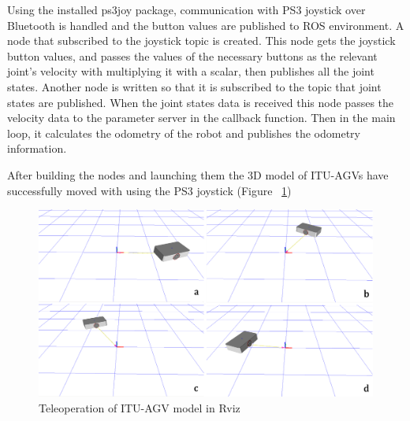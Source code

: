 		Using the installed ps3joy package, communication with PS3 joystick over Bluetooth is handled and the button values are published to ROS environment. A node that subscribed to the joystick topic is created. This node gets the joystick button values, and passes the values of the necessary buttons as the relevant joint’s velocity with multiplying it with a scalar, then publishes all the joint states. Another node is written so that it is subscribed to the topic that joint states are published. When the joint states data is received this node passes the velocity data to the parameter server in the callback function. Then in the main loop, it calculates the odometry of the robot and publishes the odometry information. 
		\par
		After building the nodes and launching them the 3D model of ITU-AGVs have successfully moved with using the PS3 joystick (Figure ~\ref{fig:agv-teleop-sim})	
		\begin{figure}[h]
			\centering
			\includegraphics[scale=0.3]{images/agv-teleop-sim}
			\caption{Teleoperation of ITU-AGV model in Rviz}
			\label{fig:agv-teleop-sim}
		\end{figure}		
